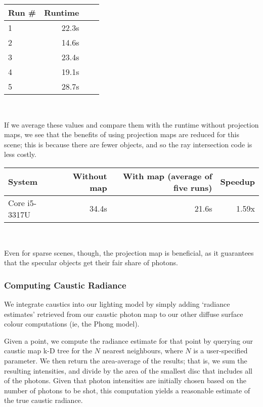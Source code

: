 \documentclass{article}
\begin{document}
\begin{center}
\begin{tabular}{|l|r|r|r|} \hline
  Run \# & Runtime \\\hline
       1 & 22.3s \\\hline
       2 & 14.6s \\\hline
      3 & 23.4s \\\hline
      4 & 19.1s \\\hline
    5 & 28.7s \\\hline
\end{tabular} \\
\end{center}

If we average these values and compare them with the runtime without projection maps, we see that the benefits of using projection maps are reduced for this scene; this is because there are fewer objects, and so the ray intersection code is less costly.

\begin{center}
\begin{tabular}{|l|r|r|r|} \hline
 System & Without map & With map (average of five runs) & Speedup \\\hline
 Core i5-3317U & 34.4s & 21.6s & 1.59x \\\hline
\end{tabular} \\
\end{center}

Even for sparse scenes, though, the projection map is beneficial, as it guarantees that the specular objects get their fair share of photons.

\subsubsection{Computing Caustic Radiance}

We integrate caustics into our lighting model by simply adding `radiance
estimates' retrieved from our caustic photon map to our other diffuse surface
colour computations (ie, the Phong model).

Given a point, we compute the radiance estimate for that point by querying our
caustic map k-D tree for the $N$ nearest neighbours, where $N$ is a
user-specified parameter. We then return the area-average of the results; that
is, we sum the resulting intensities, and divide by the area
of the smallest disc that includes all of the photons. Given that photon
intensities are initially chosen based on the number of photons to be shot, this
computation yields a reasonable estimate of the true caustic radiance.
\end{document}
